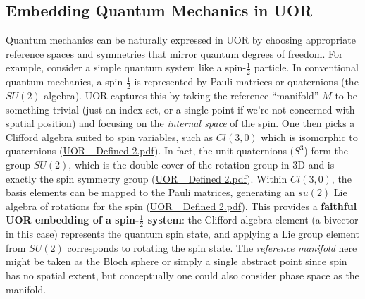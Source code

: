 \documentclass[12pt]{article}
\begin{document}
\subsection{Embedding Quantum Mechanics in UOR}

Quantum mechanics can be naturally expressed in UOR by choosing appropriate reference spaces and symmetries that mirror quantum degrees of freedom. For example, consider a simple quantum system like a spin-$\frac{1}{2}$ particle. In conventional quantum mechanics, a spin-$\frac{1}{2}$ is represented by Pauli matrices or quaternions (the $SU(2)$ algebra). UOR captures this by taking the reference ``manifold'' $M$ to be something trivial (just an index set, or a single point if we’re not concerned with spatial position) and focusing on the \emph{internal space} of the spin. One then picks a Clifford algebra suited to spin variables, such as $Cl(3,0)$ which is isomorphic to quaternions (\href{file://file-TBF3nHDaRR5QeVMmwCFYkp#:~:text=canonical%20commutations,can%20exploit%20isomorphisms%20of%20certain}{UOR\_ Defined 2.pdf}). In fact, the unit quaternions ($S^3$) form the group $SU(2)$, which is the double-cover of the rotation group in 3D and is exactly the spin symmetry group (\href{file://file-TBF3nHDaRR5QeVMmwCFYkp#:~:text=correspond%20to%20%24Spin%283%29,R%7D%29%24%29%20to%20represent}{UOR\_ Defined 2.pdf}). Within $Cl(3,0)$, the basis elements can be mapped to the Pauli matrices, generating an $su(2)$ Lie algebra of rotations for the spin (\href{file://file-TBF3nHDaRR5QeVMmwCFYkp#:~:text=correspond%20to%20%24Spin%283%29,R%7D%29%24%29%20to%20represent}{UOR\_ Defined 2.pdf}). This provides a \textbf{faithful UOR embedding of a spin-$\frac{1}{2}$ system}: the Clifford algebra element (a bivector in this case) represents the quantum spin state, and applying a Lie group element from $SU(2)$ corresponds to rotating the spin state. The \emph{reference manifold} here might be taken as the Bloch sphere or simply a single abstract point since spin has no spatial extent, but conceptually one could also consider phase space as the manifold.

\medskip
\end{document}
